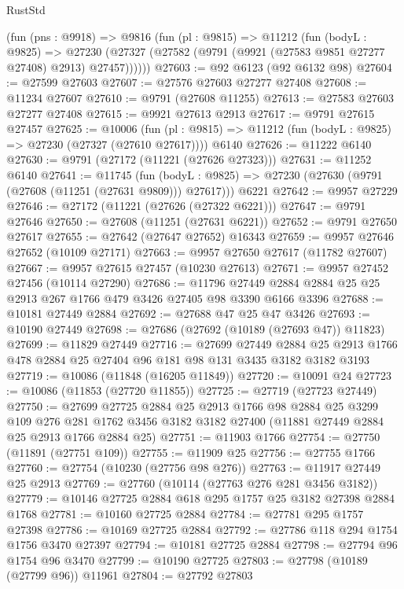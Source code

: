\begin{lexlean}{RustStd}
\begin{coremodule}
    (fun (pns : @9918) =>
    @9816
      (fun (pl : @9815) =>
      @11212
        (fun (bodyL : @9825) =>
        @27230 (@27327 (@27582 (@9791 (@9921 (@27583 @9851 @27277 @27408) @2913) @27457))))))
@27603 := @92 @6123 (@92 @6132 @98)
@27604 := @27599 @27603
@27607 := @27576 @27603 @27277 @27408
@27608 := @11234 @27607
@27610 := @9791 (@27608 @11255)
@27613 := @27583 @27603 @27277 @27408
@27615 := @9921 @27613 @2913
@27617 := @9791 @27615 @27457
@27625 := @10006
    (fun (pl : @9815) => @11212 (fun (bodyL : @9825) => @27230 (@27327 (@27610 @27617))))
    @6140
@27626 := @11222 @6140
@27630 := @9791 (@27172 (@11221 (@27626 @27323)))
@27631 := @11252 @6140
@27641 := @11745
    (fun (bodyL : @9825) => @27230 (@27630 (@9791 (@27608 (@11251 (@27631 @9809))) @27617)))
    @6221
@27642 := @9957 @27229
@27646 := @27172 (@11221 (@27626 (@27322 @6221)))
@27647 := @9791 @27646
@27650 := @27608 (@11251 (@27631 @6221))
@27652 := @9791 @27650 @27617
@27655 := @27642 (@27647 @27652) @16343
@27659 := @9957 @27646 @27652 (@10109 @27171)
@27663 := @9957 @27650 @27617 (@11782 @27607)
@27667 := @9957 @27615 @27457 (@10230 @27613)
@27671 := @9957 @27452 @27456 (@10114 @27290)
@27686 := @11796 @27449 @2884 @2884 @25 @25 @2913 @267 @1766 @479 @3426 @27405 @98 @3390 @6166 @3396
@27688 := @10181 @27449 @2884
@27692 := @27688 @47 @25 @47 @3426
@27693 := @10190 @27449
@27698 := @27686 (@27692 (@10189 (@27693 @47)) @11823)
@27699 := @11829 @27449
@27716 := @27699
    @27449
    @2884
    @25
    @2913
    @1766
    @478
    @2884
    @25
    @27404
    @96
    @181
    @98
    @131
    @3435
    @3182
    @3182
    @3193
@27719 := @10086 (@11848 (@16205 @11849))
@27720 := @10091 @24
@27723 := @10086 (@11853 (@27720 @11855))
@27725 := @27719 (@27723 @27449)
@27750 := @27699
    @27725
    @2884
    @25
    @2913
    @1766
    @98
    @2884
    @25
    @3299
    @109
    @276
    @281
    @1762
    @3456
    @3182
    @3182
    @27400
    (@11881 @27449 @2884 @25 @2913 @1766 @2884 @25)
@27751 := @11903 @1766
@27754 := @27750 (@11891 (@27751 @109))
@27755 := @11909 @25
@27756 := @27755 @1766
@27760 := @27754 (@10230 (@27756 @98 @276))
@27763 := @11917 @27449 @25 @2913
@27769 := @27760 (@10114 (@27763 @276 @281 @3456 @3182))
@27779 := @10146 @27725 @2884 @618 @295 @1757 @25 @3182 @27398 @2884 @1768
@27781 := @10160 @27725 @2884
@27784 := @27781 @295 @1757 @27398
@27786 := @10169 @27725 @2884
@27792 := @27786 @118 @294 @1754 @1756 @3470 @27397
@27794 := @10181 @27725 @2884
@27798 := @27794 @96 @1754 @96 @3470
@27799 := @10190 @27725
@27803 := @27798 (@10189 (@27799 @96)) @11961
@27804 := @27792 @27803

\end{coremodule}
\end{lexlean}

